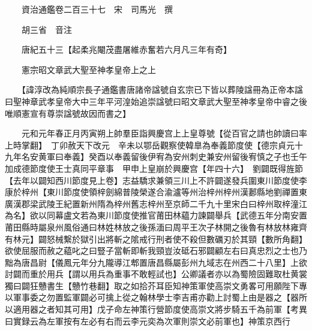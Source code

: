 










 


 
 


 

  
  
  
  
  





  
  
  
  
  
 
  

  

  
  
  



  

 
 

  
   




  

  
  


  　　資治通鑑卷二百三十七　宋　司馬光　撰

　　胡三省　音注

　　唐紀五十三【起柔兆閹茂盡屠維赤奮若六月凡三年有奇】

　　憲宗昭文章武大聖至神孝皇帝上之上

　　【諱淳改為純順宗長子通鑑書唐諸帝諡號自玄宗已下皆以葬陵諡冊為正帝本諡曰聖神章武孝皇帝大中三年平河湟始追崇諡號曰昭文章武大聖至神孝皇帝中睿之後唯順憲宣有尊崇諡號故因而書之】

　　元和元年春正月丙寅朔上帥羣臣詣興慶宫上上皇尊號【從百官之請也帥讀曰率上時掌翻】　丁卯赦天下改元　辛未以鄂岳觀察使韓臯為奉義節度使【德宗貞元十九年名安黄軍曰奉義】癸酉以奉義留後伊宥為安州刺史兼安州留後宥慎之子也壬午加成德節度使王士真同平章事　甲申上皇崩於興慶宫【年四十六】　劉闢既得旌節【去年以闢知西川節度見上卷】志益驕求兼領三川上不許闢遂發兵圍東川節度使李康於梓州【東川節度使領梓劍綿普陵榮遂合渝瀘等州治梓州梓州漢郪縣地劉禪置東廣漢郡梁武陵王紀置新州隋為梓州舊志梓州至京師二千九十里宋白曰梓州取梓潼江為名】欲以同幕盧文若為東川節度使推官莆田林藴力諫闢舉兵【武德五年分南安置莆田縣時屬泉州風俗通曰林姓林放之後孫湎曰周平王次子林開之後魯有林放林雍齊有林元】闢怒械繫於獄引出將斬之隂戒行刑者使不殺但數礪刃於其頸【數所角翻】欲使屈服而赦之藴叱之曰豎子當斬即斬我頸豈汝砥石邪闢顧左右曰真忠烈之士也乃黜為唐昌尉【儀鳳元年分九隴導江郫置唐昌縣屬彭州九域志在州西二十八里】上欲討闢而重於用兵【謂以用兵為重事不敢輕試也】公卿議者亦以為蜀險固難取杜黄裳獨曰闢狂戇書生【戇竹巷翻】取之如拾芥耳臣知神策軍使高崇文勇畧可用願陛下專以軍事委之勿置監軍闢必可擒上從之翰林學士李吉甫亦勸上討蜀上由是器之【器所以適用器之者知其可用】戊子命左神策行營節度使高崇文將步騎五千為前軍【考異曰實録云為左軍按有左必有右而云李元奕為次軍則崇文必前軍也】神策京西行

